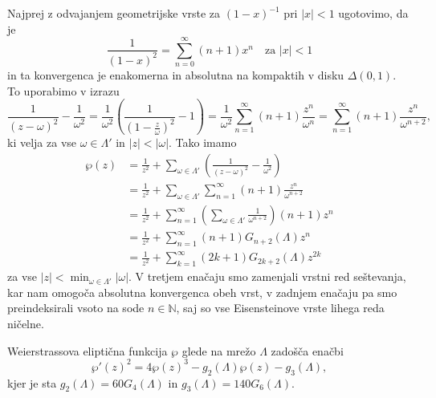 \documentclass[mat1]{fmfdelo}
\numberwithin{equation}{section}
\newcommand{\N}{\mathbb N}
\newcommand{\om}{\omega}
\newcommand{\abs}[1]{\left\lvert #1 \right\rvert}
\newcommand{\disk}[2]{\Delta(#1, #2)}
\theoremstyle{definition}
\begin{document}
\begin{dokaz}
    Najprej z odvajanjem geometrijske vrste za $(1 - x)^{-1}$ pri $\abs{x} < 1$ ugotovimo, da je 
    \[
        \frac{1}{(1 - x)^2} = \sum_{n = 0}^\infty (n + 1) x^n \quad \text{za $\abs{x} < 1$}  
    \]
    in ta konvergenca je enakomerna in absolutna na kompaktih v disku $\disk{0}{1}$. To uporabimo v izrazu
    \[
        \frac{1}{(z - \om)^2} - \frac{1}{\om^2} = 
        \frac{1}{\om^2}\left(\frac{1}{(1 - \frac{z}{\om})^2} - 1\right) = 
        \frac{1}{\om^2} \sum_{n = 1}^\infty (n + 1)\frac{z^n}{\om^{n}} = 
        \sum_{n = 1}^\infty (n + 1)\frac{z^n}{\om^{n + 2}}, 
    \]
    ki velja za vse $\om\in\Lambda'$ in $\abs{z} < \abs{\om}$. Tako imamo
    \begin{align*}
        \wp(z) &= 
        \frac{1}{z^2} + \sum_{\om\in\Lambda'}\left(\frac{1}{(z-\om)^2} - \frac{1}{\om^2}\right) \\
        &= \frac{1}{z^2} + \sum_{\om\in\Lambda'}\sum_{n = 1}^\infty (n + 1)\frac{z^n}{\om^{n + 2}} \\
        &= \frac{1}{z^2} + \sum_{n = 1}^\infty \left( \sum_{\om\in\Lambda'} \frac{1}{\om^{n + 2}} \right) (n + 1) z^n \\
        &= \frac{1}{z^2} + \sum_{n = 1}^\infty (n + 1) G_{n + 2}(\Lambda) z^n \\
        &= \frac{1}{z^2} + \sum_{k = 1}^\infty (2k + 1) G_{2k + 2}(\Lambda) z^{2k}
    \end{align*}
    za vse $\abs{z} < \min_{\om\in\Lambda'}\abs{\om}$. V tretjem enačaju smo zamenjali vrstni red seštevanja, kar nam omogoča absolutna konvergenca obeh vrst, v zadnjem enačaju pa smo preindeksirali vsoto na sode $n\in \N$, saj so vse Eisensteinove vrste lihega reda ničelne. 
\end{dokaz}

\begin{izrek}
    \label{ode za wp}
    Weierstrassova eliptična funkcija $\wp$ glede na mrežo $\Lambda$ zadošča enačbi
    \begin{equation}
        \label{wp identiteta}
        \wp'(z)^2 = 4\wp(z)^3 - g_2(\Lambda)\wp(z) - g_3(\Lambda),
    \end{equation}
    kjer je sta $g_2(\Lambda) = 60G_4(\Lambda)$ in $g_3(\Lambda) = 140G_6(\Lambda)$.
\end{izrek}
\end{document}
